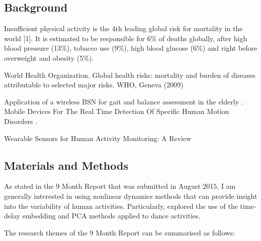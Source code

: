 \documentclass[12pt,journal,onecolumn,compsoc]{IEEEtran}
\begin{document}
\subsection{Background}


Insufficient physical activity is the 4th leading global risk
for mortality in the world [1]. It is estimated to be responsible for 6\%
of deaths globally, after high blood pressure (13\%), tobacco use (9\%), high blood glucose (6\%) 
and right before overweight and obesity (5\%).


 World Health Organization. Global health risks: mortality and burden of diseases attributable to selected major
 risks. WHO, Geneva (2009)
% 



Application of a wireless BSN for gait and balance assessment in the elderly \cite{Caldara2015}.
Mobile Devices For The Real Time Detection Of Specific Human Motion Disorders \cite{Lorenzi2016}.


Wearable Sensors for Human Activity Monitoring: A Review



\subsection{Materials and Methods}
As stated in the 9 Month Report that was submitted in August 2015,
I am generally interested in using nonlinear dynamics methods 
that can provide insight into the variability of human activities.
Particularly, explored the use of the time-delay embedding and PCA methods
applied to dance activities. 

The research themes of the 9 Month Report can be summarised as follows:
\end{document}
